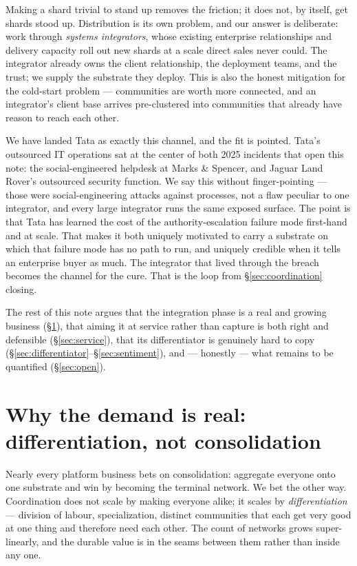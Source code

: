 \documentclass[11pt]{article}
\begin{document}
Making a shard trivial to stand up removes the friction; it does not, by itself, get shards stood up. Distribution is its own problem, and our answer is deliberate: work through \emph{systems integrators}, whose existing enterprise relationships and delivery capacity roll out new shards at a scale direct sales never could. The integrator already owns the client relationship, the deployment teams, and the trust; we supply the substrate they deploy. This is also the honest mitigation for the cold-start problem --- communities are worth more connected, and an integrator's client base arrives pre-clustered into communities that already have reason to reach each other.

We have landed Tata as exactly this channel, and the fit is pointed. Tata's outsourced IT operations sat at the center of both 2025 incidents that open this note: the social-engineered helpdesk at Marks \& Spencer, and Jaguar Land Rover's outsourced security function. We say this without finger-pointing --- those were social-engineering attacks against processes, not a flaw peculiar to one integrator, and every large integrator runs the same exposed surface. The point is that Tata has learned the cost of the authority-escalation failure mode first-hand and at scale. That makes it both uniquely motivated to carry a substrate on which that failure mode has no path to run, and uniquely credible when it tells an enterprise buyer as much. The integrator that lived through the breach becomes the channel for the cure. That is the loop from \S\ref{sec:coordination} closing.

The rest of this note argues that the integration phase is a real and growing business (\S\ref{sec:demand}), that aiming it at service rather than capture is both right and defensible (\S\ref{sec:service}), that its differentiator is genuinely hard to copy (\S\ref{sec:differentiator}--\S\ref{sec:sentiment}), and --- honestly --- what remains to be quantified (\S\ref{sec:open}).

\section{Why the demand is real: differentiation, not consolidation}\label{sec:demand}

Nearly every platform business bets on consolidation: aggregate everyone onto one substrate and win by becoming the terminal network. We bet the other way. Coordination does not scale by making everyone alike; it scales by \emph{differentiation} --- division of labour, specialization, distinct communities that each get very good at one thing and therefore need each other. The count of networks grows super-linearly, and the durable value is in the seams between them rather than inside any one.
\end{document}
